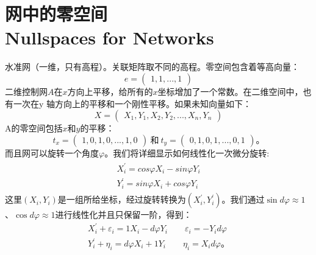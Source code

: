 \section[网中的零空间]{网中的零空间\\Nullspaces for Networks}	
\par \noindent
水准网（一维，只有高程）。关联矩阵取不同的高程。零空间包含着等高向量：
\begin{equation}
	e =
	\begin{pmatrix}
		1,1,...,1
	\end{pmatrix}
\end{equation}
二维控制网$A$在$x$方向上平移，给所有的$x$坐标增加了一个常数。在二维空间中，也有一次在y 轴方向上的平移和一个刚性平移。如果未知向量如下：
\begin{equation}
	X =
	\begin{pmatrix}
		X_1,Y_1,X_2,Y_2,...,X_n,Y_n
	\end{pmatrix}
\end{equation}
A的零空间包括$x$和$y$的平移：
\begin{equation}
	t_x =
	\begin{pmatrix}
		1,0,1,0,...,1,0
	\end{pmatrix}
	\  \text{和}\   t_y =
	\begin{pmatrix}
		0,1,0,1,...,0,1
	\end{pmatrix} \text{。}
\end{equation}
而且网可以旋转一个角度$φ$。我们将详细显示如何线性化一次微分旋转:
\begin{align}
	\begin{split}
		X_{i}^{'} = cos{\varphi}X_i - sin{\varphi}Y_i \\
		Y_{i}^{'} = sin{\varphi}X_i + cos{\varphi}Y_i
	\end{split}
\end{align}
这里$(X_i,Y_i)$是一组所给坐标，经过旋转转换为$(X_{i}^{'}, Y_{i}^{'})$。我们通过$\sin d\varphi \approx 1$ 、$\cos d\varphi \approx 1$进行线性化并且只保留一阶，得到：
\begin{align*}
	X_{i}^{'} + \varepsilon_i = 1 X_i - d\varphi Y_i\qquad  \varepsilon_i = -Y_i d\varphi   \\
	Y_{i}^{'} + \eta_i = d\varphi X_i + 1 Y_i\qquad
	\eta_i = X_i d\varphi \text{。}
\end{align*}

